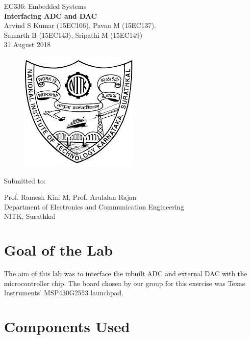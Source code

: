 \documentclass[12pt, letterpaper]{article}
\begin{document}
\begin{titlepage}

\begin{center}
	\large{EC336: Embedded Systems}\\
	\huge{\textbf{Interfacing ADC and DAC}}\\
	\large{Arvind S Kumar (15EC106), Pavan M (15EC137),\\ Samarth B (15EC143), Sripathi M (15EC149)}\\
	\large{31 August 2018}
\end{center}	

\begin{figure}[!h]
	\centering
	\includegraphics[scale=0.8]{NITKEmblem.png}
	\label{fig:NITKEmblem}
\end{figure}	
\begin{center}
	
\huge{Submitted to:}\\
\begin{large}
Prof. Ramesh Kini M, Prof. Arulalan Rajan\\
Department of Electronics and Communication Engineering\\
NITK, Surathkal
\end{large}

\end{center}

\end{titlepage}

\section{Goal of the Lab}

The aim of this lab was to interface the inbuilt ADC and external DAC  with the microcontroller chip. The board chosen by our group for this exercise was Texas Instruments' MSP430G2553 launchpad.

\section{Components Used}
\end{document}
